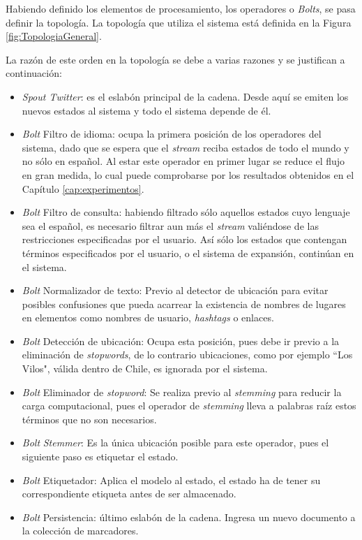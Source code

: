 Habiendo definido los elementos de procesamiento, los operadores o \textit{Bolts}, se pasa definir la topología. La topología que utiliza el sistema está definida en la Figura \ref{fig:TopologiaGeneral}.

La razón de este orden en la topología se debe a varias razones y se justifican a continuación:

\begin{itemize}
\item \textit{Spout Twitter}: es el eslabón principal de la cadena. Desde aquí se emiten los nuevos estados al sistema y todo el sistema depende de él. 
\item \textit{Bolt} Filtro de idioma: ocupa la primera posición de los operadores del sistema, dado que se espera que el \textit{stream} reciba estados de todo el mundo y no sólo en español. Al estar este operador en primer lugar se reduce el flujo en gran medida, lo cual puede comprobarse por los resultados obtenidos en el Capítulo \ref{cap:experimentos}.
\item \textit{Bolt} Filtro de consulta: habiendo filtrado sólo aquellos estados cuyo lenguaje sea el español, es necesario filtrar aun más el \textit{stream} valiéndose de las restricciones especificadas por el usuario. Así sólo los estados que contengan términos especificados por el usuario, o el sistema de expansión, continúan en el sistema.
\item\textit{Bolt} Normalizador de texto: Previo al detector de ubicación para evitar posibles confusiones que pueda acarrear la existencia de nombres de lugares en elementos como nombres de usuario, \textit{hashtags} o enlaces.
\item\textit{Bolt} Detección de ubicación: Ocupa esta posición, pues debe ir previo a la eliminación de \textit{stopwords}, de lo contrario ubicaciones, como por ejemplo ``Los Vilos", válida dentro de Chile, es ignorada por el sistema.
\item\textit{Bolt} Eliminador de \textit{stopword}: Se realiza previo al \textit{stemming} para reducir la carga computacional, pues el operador de \textit{stemming} lleva a palabras raíz estos términos que no son necesarios.
\item\textit{Bolt} \textit{Stemmer}: Es la única ubicación posible para este operador, pues el siguiente paso es etiquetar el estado.
\item\textit{Bolt} Etiquetador: Aplica el modelo al estado, el estado ha de tener su correspondiente etiqueta antes de ser almacenado.
\item\textit{Bolt} Persistencia: último eslabón de la cadena. Ingresa un nuevo documento a la colección de marcadores.
\end{itemize}

